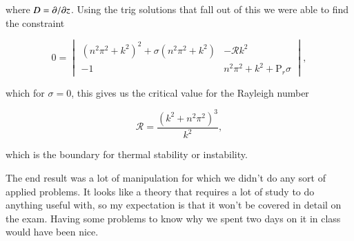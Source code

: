 where $D = {\partial {}}/{\partial {z}}$.  Using the trig solutions that fall out of this we were able to find the constraint

\begin{equation}\label{eqn:continuumFluidsReview:490a}
0 =
\begin{vmatrix}
\left( n^2 \pi^2 + k^2 \right)^2 + \sigma \left( n^2 \pi^2 + k^2\right) & -\mathcal{R} k^2 \\
-1 & n^2 \pi^2 + k^2 + \text{P}_r \sigma
\end{vmatrix},
\end{equation}

which for $\sigma = 0$, this gives us the critical value for the Rayleigh number

\begin{equation}\label{eqn:continuumFluidsReview:510a}
\mathcal{R} = \frac{(k^2 + n^2 \pi^2)^3}{k^2},
\end{equation}

which is the boundary for thermal stability or instability.

The end result was a lot of manipulation for which we didn't do any sort of applied problems.  It looks like a theory that requires a lot of study to do anything useful with, so my expectation is that it won't be covered in detail on the exam.  Having some problems to know why we spent two days on it in class would have been nice.

